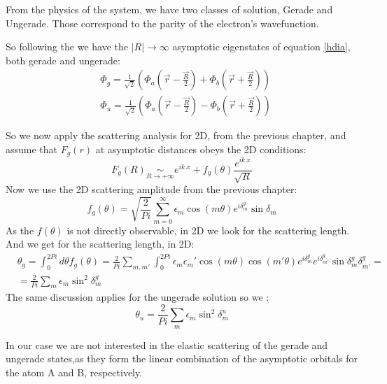 From the physics of the system, we have two classes of solution, Gerade and Ungerade. Those correspond to the parity of the electron's wavefunction.

So following the \cite{Dalgarno1953} we have the $ |R| \rightarrow \infty $ asymptotic eigenstates of equation \eqref{hdia}, both gerade and ungerade:
\begin{equation}
\begin{split}
  & \Phi_g = \frac{1}{\sqrt{2}}\left(\Phi_a(\vec{r} - \frac{\vec{R}}{2}) + \Phi_b(\vec{r} + \frac{\vec{R}}{2})\right) \\
  & \Phi_u = \frac{1}{\sqrt{2}}\left(\Phi_a(\vec{r} - \frac{\vec{R}}{2}) - \Phi_b(\vec{r} + \frac{\vec{R}}{2})\right) 
\end{split}
\end{equation}

So we now apply the scattering analysis for 2D, from the previous chapter, and assume that $ F_g(r) $ at asymptotic distances obeys the 2D conditions:
\begin{equation}
  F_g(R) \underset{R \rightarrow +\infty}{\sim} e^{ik\ x} + f_g(\theta)\frac{e^{ik\ x}}{\sqrt{R}} 
\end{equation}
Now we use the 2D scattering amplitude from the previous chapter:
\begin{equation}\label{fgampl}
  f_g(\theta) = \sqrt{\frac{2}{Pi}}\sum_{m=0}^{\infty}{\epsilon_m \cos(m\theta)e^{i\delta_m^g}\sin\delta_m}
\end{equation}
As the $ f(\theta) $ is not directly observable, in 2D we look for the scattering length. And we get for the scattering length, in 2D:
\begin{equation}
\begin{split}
  & \theta_g = \int_{0}^{2Pi}{d\theta f_g(\theta)} = \frac{2}{Pi}\sum_{m,m'}\int_{0}^{2Pi}{\epsilon_m\epsilon_m' \cos(m\theta)\cos(m'\theta)e^{i\delta_{m}^g}e^{i\delta_{m'}^g}\sin\delta_m^g\delta_{m'}^g} = \\
  & = \frac{2}{Pi}\sum_{m}{\epsilon_m\sin^2\delta_m^g}
\end{split}
\end{equation}
The same discussion applies for the ungerade solution so we :
\begin{equation}
  \theta_u = \frac{2}{Pi}\sum_{m}{\epsilon_m\sin^2\delta_m^u}
\end{equation}

In our case we are not interested in the elastic scattering of the gerade and ungerade states,as they form the linear combination of the asymptotic orbitals for the atom A and B, respectively.

